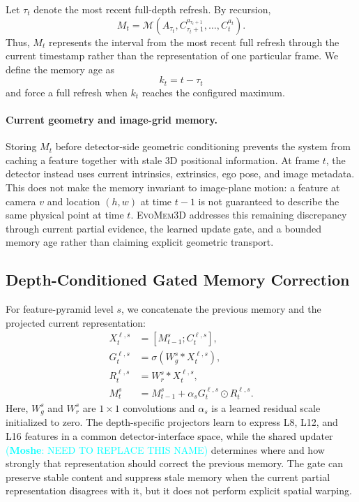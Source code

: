 \documentclass[10pt,twocolumn,letterpaper]{article}
\newcommand{\method}{\textsc{EvoMem3D}}
\newcommand\mk[1]{\textcolor{cyan}{(\textbf{Moshe}: #1)}}
\begin{document}
Let $\tau_t$ denote the most recent full-depth refresh. By recursion,
\begin{equation}
M_t =
\mathcal{M}\!\left(
A_{\tau_t},
C_{\tau_t+1}^{a_{\tau_t+1}},
\ldots,
C_t^{a_t}
\right).
\end{equation}
Thus, $M_t$ represents the interval from the most recent full refresh
through the current timestamp rather than the representation of one
particular frame. We define the memory age as
\begin{equation}
k_t=t-\tau_t
\end{equation}
and force a full refresh when $k_t$ reaches the configured maximum.

\paragraph{Current geometry and image-grid memory.}
Storing $M_t$ before detector-side geometric conditioning prevents
the system from caching a feature together with stale 3D positional
information. At frame $t$, the detector instead uses current
intrinsics, extrinsics, ego pose, and image metadata. This does not
make the memory invariant to image-plane motion: a feature at camera
$v$ and location $(h,w)$ at time $t-1$ is not guaranteed to describe
the same physical point at time $t$. \method{} addresses this
remaining discrepancy through current partial evidence, the learned
update gate, and a bounded memory age rather than claiming explicit
geometric transport.

\subsection{Depth-Conditioned Gated Memory Correction}

For feature-pyramid level $s$, we concatenate the previous memory and
the projected current representation:
\begin{align}
X_t^{\ell,s} &= [M_{t-1}^s;C_t^{\ell,s}],\\
G_t^{\ell,s} &=
\sigma\!\left(W_g^s * X_t^{\ell,s}\right),\\
R_t^{\ell,s} &=
W_r^s * X_t^{\ell,s},\\
M_t^s &= M_{t-1}^s+
\alpha_s G_t^{\ell,s}\odot R_t^{\ell,s}.
\end{align}
Here, $W_g^s$ and $W_r^s$ are $1\times1$ convolutions and
$\alpha_s$ is a learned residual scale initialized to zero. The
depth-specific projectors learn to express L8, L12, and L16 features
in a common detector-interface space, while the shared updater \mk{NEED TO REPLACE THIS NAME}
determines where and how strongly that representation should correct
the previous memory. The gate can preserve stable content and
suppress stale memory when the current partial representation
disagrees with it, but it does not perform explicit spatial warping.
\end{document}
